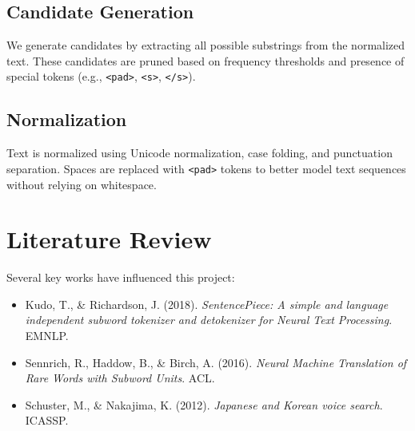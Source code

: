 \documentclass[twoside,11pt]{article}
\begin{document}
\subsection{Candidate Generation}
We generate candidates by extracting all possible substrings from the normalized text. These candidates are pruned based on frequency thresholds and presence of special tokens (e.g., \texttt{<pad>}, \texttt{<s>}, \texttt{</s>}).

\subsection{Normalization}
Text is normalized using Unicode normalization, case folding, and punctuation separation. Spaces are replaced with \texttt{<pad>} tokens to better model text sequences without relying on whitespace.



\begin{table}[h!]
\centering
{}
\caption{Comparison of tokenization performance across models.}
\end{table}

\section{Literature Review}
Several key works have influenced this project:
\begin{itemize}
    \item Kudo, T., \& Richardson, J. (2018). \textit{SentencePiece: A simple and language independent subword tokenizer and detokenizer for Neural Text Processing}. EMNLP.
    \item Sennrich, R., Haddow, B., \& Birch, A. (2016). \textit{Neural Machine Translation of Rare Words with Subword Units}. ACL.
    \item Schuster, M., \& Nakajima, K. (2012). \textit{Japanese and Korean voice search}. ICASSP.
\end{itemize}
\end{document}
